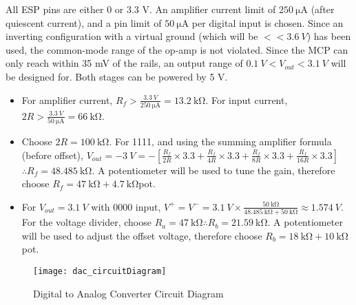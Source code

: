 All ESP pins are either 0 or 3.3 V. An amplifier current limit of $\SI{250}{\micro\ampere}$ (after quiescent current),
and a pin limit of $\SI{50}{\micro\ampere}$ per digital input is chosen. Since an inverting configuration with a virtual ground (which will be $<< \SI{3.6}{V}$) has been used,
the common-mode range of the op-amp is not violated. Since the MCP can only reach within 35 mV of the rails, an output range of $\SI{0.1}{V} < V_{out} < \SI{3.1}{V}$ will be designed for.
Both stages can be powered by 5 V.
\begin{itemize}
    \item For amplifier current, $R_f > \frac{\SI{3.3}{V}}{\SI{250}{\micro\ampere}} = \SI{13.2}{\kilo\ohm}$.
          For input current, $2R > \frac{\SI{3.3}{V}}{\SI{50}{\micro\ampere}} = \SI{66}{\kilo\ohm}$. 
    \item Choose $2R = \SI{100}{\kilo\ohm}$. For 1111, and using the summing amplifier formula (before offset),
          $V_{out} = \SI{-3}{V} = -\left[ \frac{R_f}{2R} \times 3.3 + \frac{R_f}{4R} \times 3.3 + \frac{R_f}{8R} \times 3.3 + \frac{R_f}{16R} \times 3.3 \right]$
          $\therefore R_f = \SI{48.485}{\kilo\ohm}$. A potentiometer will be used to tune the gain, therefore choose $R_f = \SI{47}{\kilo\ohm} + \SI{4.7}{\kilo\ohm}$pot.
    \item For $V_{out} = \SI{3.1}{V}$ with 0000 input, $V^+ = V^- = \SI{3.1}{V} \times \frac{\SI{50}{\kilo\ohm}}{\SI{48.485}{\kilo\ohm} + \SI{50}{\kilo\ohm}} \approx \SI{1.574}{V}$.
          For the voltage divider, choose $R_a = \SI{47}{\kilo\ohm} \therefore R_b = \SI{21.59}{\kilo\ohm}$. A potentiometer will be used to adjust the offset voltage,
          therefore choose $R_b = \SI{18}{\kilo\ohm} + \SI{10}{\kilo\ohm}$pot.
\end{itemize}

\begin{figure}[!htb]
  \centering
  \texttt{[image: dac\_circuitDiagram]}
  \caption{Digital to Analog Converter Circuit Diagram}
  \label{fig:dac_circuitDiagram}
\end{figure}